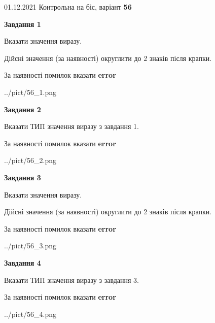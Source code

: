 \documentclass[11pt, ukrainian]{article}
\begin{document}
{01.12.2021 Контрольна на біс, варіант  \No \textbf { 56 }\par}
{
\begin {large}
{\begin {center}\textbf{Завдання 1}\end {center}}\par
Вказати значення виразу. \par
Дійсні значення (за наявності) округлити до 2 знаків після крапки. \par
За наявності помилок вказати \textbf{error}

\begin{center}
	{../pict/56_1.png}
\end{center}
\newpage

{\begin {center}\textbf{Завдання 2}\end {center}}\par
Вказати ТИП значення виразу з завдання 1. \par
За наявності помилок вказати \textbf{error}

\begin{center}
	{../pict/56_2.png}
\end{center}
\newpage

{\begin {center}\textbf{Завдання 3}\end {center}}\par
Вказати значення виразу. \par
Дійсні значення (за наявності) округлити до 2 знаків після крапки. \par
За наявності помилок вказати \textbf{error}

\begin{center}
	{../pict/56_3.png}
\end{center}
\newpage

{\begin {center}\textbf{Завдання 4}\end {center}}\par
Вказати ТИП значення виразу з завдання 3. \par
За наявності помилок вказати \textbf{error}

\begin{center}
	{../pict/56_4.png}
\end{center}
\newpage


\end{large}}
\end{document}
